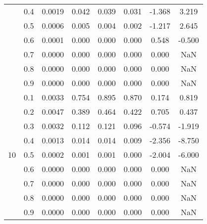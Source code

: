 \documentclass[11pt,a4paper]{report}
\begin{document}
\begin{longtable}{ | c | c || c | c | c | c | c | c | }
 & 0.4 & 0.0019 & 0.042 & 0.039 & 0.031 & -1.368 & 3.219 \\
 & 0.5 & 0.0006 & 0.005 & 0.004 & 0.002 & -1.217 & 2.645 \\
 & 0.6 & 0.0001 & 0.000 & 0.000 & 0.000 & 0.548 & -0.500 \\
 & 0.7 & 0.0000 & 0.000 & 0.000 & 0.000 & 0.000 & NaN \\
 & 0.8 & 0.0000 & 0.000 & 0.000 & 0.000 & 0.000 & NaN \\
 & 0.9 & 0.0000 & 0.000 & 0.000 & 0.000 & 0.000 & NaN \\
 \hline
\multirow{9}{*}{10} & 0.1 & 0.0033 & 0.754 & 0.895 & 0.870 & 0.174 & 0.819 \\
 & 0.2 & 0.0047 & 0.389 & 0.464 & 0.422 & 0.705 & 0.437 \\
 & 0.3 & 0.0032 & 0.112 & 0.121 & 0.096 & -0.574 & -1.919 \\
 & 0.4 & 0.0013 & 0.014 & 0.014 & 0.009 & -2.356 & -8.750 \\
 & 0.5 & 0.0002 & 0.001 & 0.001 & 0.000 & -2.004 & -6.000 \\
 & 0.6 & 0.0000 & 0.000 & 0.000 & 0.000 & 0.000 & NaN \\
 & 0.7 & 0.0000 & 0.000 & 0.000 & 0.000 & 0.000 & NaN \\
 & 0.8 & 0.0000 & 0.000 & 0.000 & 0.000 & 0.000 & NaN \\
 & 0.9 & 0.0000 & 0.000 & 0.000 & 0.000 & 0.000 & NaN \\
 \hline
\hline
\end{longtable}
\end{document}
